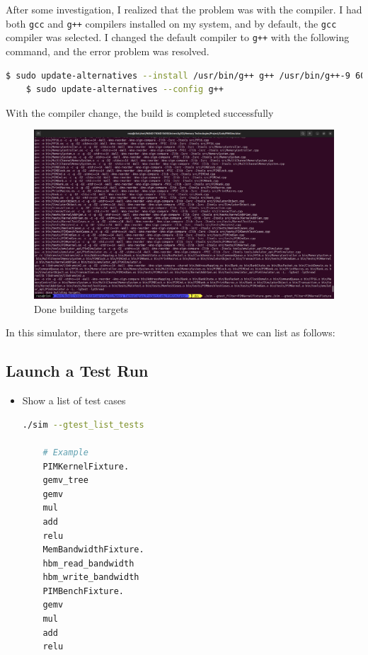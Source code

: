\documentclass[12pt]{article}
\begin{document}
After some investigation, I realized that the problem was with the compiler.
I had both \texttt{gcc} and \texttt{g++} compilers installed on my system, and by default, the \texttt{gcc} compiler was selected.
I changed the default compiler to \texttt{g++} with the following command, and the error problem was resolved.

\begin{lstlisting}[language=bash]
	$ sudo update-alternatives --install /usr/bin/g++ g++ /usr/bin/g++-9 60
	$ sudo update-alternatives --config g++
\end{lstlisting}

With the compiler change, the build is completed successfully

\begin{figure}[h]
	\centering
	\includegraphics[width=1\textwidth]{Images/img5.png}
	\caption{Done building targets}
	\label{fig:Done building targets}
\end{figure}

In this simulator, there are pre-written examples that we can list as follows:

\subsection{Launch a Test Run}
\begin{itemize}
\item Show a list of test cases
\begin{lstlisting}[language=bash]
	./sim --gtest_list_tests
	
	# Example
	PIMKernelFixture.
	gemv_tree
	gemv
	mul
	add
	relu
	MemBandwidthFixture.
	hbm_read_bandwidth
	hbm_write_bandwidth
	PIMBenchFixture.
	gemv
	mul
	add
	relu
\end{lstlisting}
\end{itemize}
\end{document}
